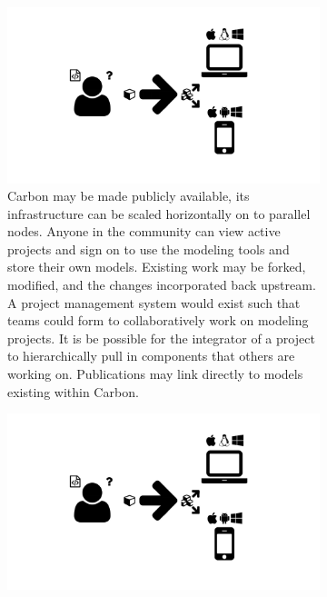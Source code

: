 \begin{figure}
  \centering
  \begin{subfigure}[b]{0.5\textwidth}
    \includegraphics[width=\textwidth, page=30, trim=0cm 0cm 14cm 7cm, clip=true]{images/Figures.pdf}
    \caption{Carbon may be made publicly available, its infrastructure can be scaled horizontally on to parallel nodes.
      Anyone in the community can view active projects and sign on to use the modeling tools and store their own models.
      Existing work may be forked, modified, and the changes incorporated back upstream.
      A project management system would exist such that teams could form to collaboratively work on modeling projects.
      It is be possible for the integrator of a project to hierarchically pull in components that others are working on.
      Publications may link directly to models existing within Carbon.}
    \label{Figure:carbon-public}
  \end{subfigure}
  \begin{subfigure}[b]{0.45\textwidth}
    \includegraphics[width=\textwidth, page=31, trim=0cm 0cm 17cm 9cm, clip=true]{images/Figures.pdf}

\end{subfigure}
\end{figure}
